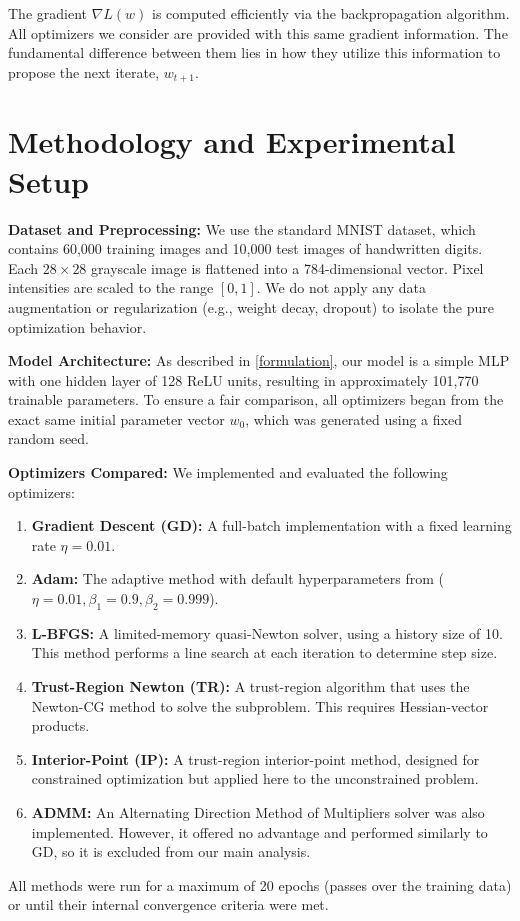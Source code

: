 \documentclass[20pt]{article}
\begin{document}
The gradient $\nabla L(w)$ is computed efficiently via the backpropagation algorithm. All optimizers we consider are provided with this same gradient information. The fundamental difference between them lies in how they utilize this information to propose the next iterate, $w_{t+1}$.

\clearpage

\section{Methodology and Experimental Setup} \label{methodology}
\textbf{Dataset and Preprocessing:} We use the standard MNIST dataset, which contains 60,000 training images and 10,000 test images of handwritten digits. Each $28 \times 28$ grayscale image is flattened into a 784-dimensional vector. Pixel intensities are scaled to the range $[0, 1]$. We do not apply any data augmentation or regularization (e.g., weight decay, dropout) to isolate the pure optimization behavior.

\textbf{Model Architecture:} As described in \cref{formulation}, our model is a simple MLP with one hidden layer of 128 ReLU units, resulting in approximately 101,770 trainable parameters. To ensure a fair comparison, all optimizers began from the exact same initial parameter vector $w_0$, which was generated using a fixed random seed.

\textbf{Optimizers Compared:} We implemented and evaluated the following optimizers:
\begin{enumerate}
    \item \textbf{Gradient Descent (GD):} A full-batch implementation with a fixed learning rate $\eta = 0.01$.
    \item \textbf{Adam:} The adaptive method with default hyperparameters from \cite{Kingma2015Adam} ($\eta=0.01, \beta_1=0.9, \beta_2=0.999$).
    \item \textbf{L-BFGS:} A limited-memory quasi-Newton solver, using a history size of 10. This method performs a line search at each iteration to determine step size.
    \item \textbf{Trust-Region Newton (TR):} A trust-region algorithm that uses the Newton-CG method to solve the subproblem. This requires Hessian-vector products.
    \item \textbf{Interior-Point (IP):} A trust-region interior-point method, designed for constrained optimization but applied here to the unconstrained problem.
    \item \textbf{ADMM:} An Alternating Direction Method of Multipliers solver was also implemented. However, it offered no advantage and performed similarly to GD, so it is excluded from our main analysis.
\end{enumerate}
All methods were run for a maximum of 20 epochs (passes over the training data) or until their internal convergence criteria were met.
\end{document}
